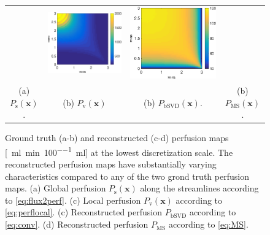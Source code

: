 \documentclass[final,5p,times,twocolumn]{elsarticle}
\begin{document}
\begin{figure}[h!tb]
\begin{tabular}{c c c c}
		& \includegraphics[width=\fwd]{figs/E110_CBFOnDifferentResolutions_plot-bSVD-scaleto-none-raw.eps}
		& \includegraphics[width=\fwd]{figs/E110_CBFOnDifferentResolutions_plot-MS-scaleto-none-raw.eps}\\
		(a) $P_{\mathrm{s}}(\mathbf{x})$. & (b) $P_{\mathrm{v}}(\mathbf{x})$ & (b) $P_{\mathrm{bSVD}}(\mathbf{x})$. & (b) $P_{\mathrm{MS}}(\mathbf{x})$.
	\end{tabular}
	\caption{Ground truth (a-b) and reconstructed (c-d) perfusion maps [\SI{}{\milli\litre\per\minute\per 100\milli\litre}] at the lowest discretization scale. The reconstructed perfusion maps have substantially varying characteristics compared to any of the two grond truth perfusion maps. (a) Global perfusion $P_{\mathrm{s}}(\mathbf{x})$ along the streamlines according to \eqref{eq:flux2perf}. (c) Local perfusion $P_{\mathrm{v}}(\mathbf{x})$ according to \eqref{eq:perflocal}. (c) Reconstructed perfusion $P_{\mathrm{bSVD}}$ according to \eqref{eq:conv}. (d) Reconstructed perfusion $P_{\mathrm{MS}}$ according to \eqref{eq:MS}.}
        \label{fig:perfusionmaps}
\end{figure}	
\end{document}

